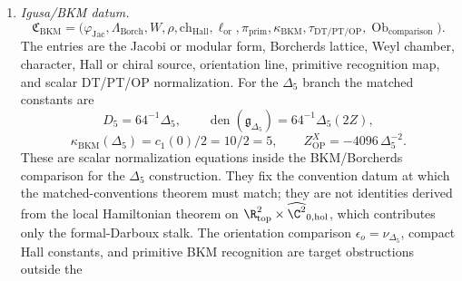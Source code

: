 \begin{defn}
\begin{enumerate}[label=(\roman*)]
\[      \mathfrak K_{\mathrm{KD}},
      \operatorname{Ob}_{\mathrm{comparison}}\bigr).
      \]
      Here \(Y^3\) is the compact Calabi--Yau threefold, \(\Omega_Y\) the
      holomorphic volume form, \(\mathrm{PV}^{*,*}(Y)[[t]]\) the
      polyvector-field BCOV field complex, \(Q_{\mathrm{BCOV}}\) the
      BCOV differential, \(P_{\mathrm{prop}}\) the global gauge-fixed
	      propagator, \(I_{\mathrm{ct}}\) the counterterm scheme, and
      \(\mc O_{\mathrm{HAE}}\) the holomorphic-anomaly/QME obstruction
      complex.  The BCOV holomorphic anomaly equation
      \(\bar\partial_{\bar i}F_g=\tfrac12\bar
      C_{\bar i}^{jk}(D_jD_kF_{g-1}+\sum_{h+h'=g}D_jF_h\,D_kF_{h'})\)
      is a target equation in this datum~\cite{bcov}; it belongs to
      the comparison datum for global BCOV theory rather than to the
      local
      \(\R^2_{\mathrm{top}}\times\widehat{\C^2}_0\) theorem.  Compact
      Calabi--Yau threefolds and genus expansions enter in this datum.
      Open data such as
      \((L,\mathfrak f_{S^3},h_{\mathfrak f},
      \operatorname{Ob}_{\mathrm{frame}})\) form a separate brane
      datum.
    \item \emph{Igusa/BKM datum.}
      \[
      \mathfrak C_{\mathrm{BKM}}=
      \bigl(\varphi_{\mathrm{Jac}},\Lambda_{\mathrm{Borch}},
      W,\rho,\mathrm{ch}_{\mathrm{Hall}},\ell_{\mathrm{or}},
      \pi_{\mathrm{prim}},\kappa_{\mathrm{BKM}},
      \tau_{\mathrm{DT/PT/OP}},
      \operatorname{Ob}_{\mathrm{comparison}}\bigr).
      \]
      The entries are the Jacobi or modular form, Borcherds lattice, Weyl
      chamber, character, Hall or chiral source, orientation line, primitive
      recognition map, and scalar DT/PT/OP normalization.
	      For the \(\Delta_5\) branch the matched constants are
      \[
        D_5=64^{-1}\Delta_5,\qquad
        \operatorname{den}(\mathfrak g_{\Delta_5})
          =64^{-1}\Delta_5(2Z),
      \]
      \[
        \kappa_{\mathrm{BKM}}(\Delta_5)=c_1(0)/2=10/2=5,\qquad
        Z^X_{\mathrm{OP}}=-4096\,\Delta_5^{-2}.
      \]
      These are scalar normalization equations inside the
      BKM/Borcherds comparison for the \(\Delta_5\) construction.  They
      fix the convention datum at which the matched-conventions theorem
      must match; they are not identities derived from the local
      Hamiltonian theorem on
      \(\R^2_{\mathrm{top}}\times\widehat{\C^2}_{0,\mathrm{hol}}\),
      which contributes only the formal-Darboux stalk.  The
      orientation comparison
      \(\epsilon_o=\nu_{\Delta_5}\), compact Hall constants, and
      primitive BKM recognition are target obstructions outside the

\end{enumerate}
\end{defn}
